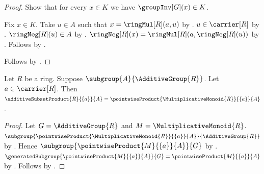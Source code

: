 \begin{proof}
    Show that for every $x\in K$ we have $\groupInv[G](x)\in K$.
    \begin{subproof}
        Fix $x\in K$.
        Take $u\in A$ such that $x=\ringMul[R](a,u)$ by
            .
        $u\in\carrier[R]$ by .
        $\ringNeg[R](u)\in A$ by
            .
        $\ringNeg[R](x)=\ringMul[R](a,\ringNeg[R](u))$ by
            .
        Follows by
            .
    \end{subproof}
    Follows by .
\end{proof}

\begin{proposition}\label{additive_subset_product_singleton_subgroup}
    Let $R$ be a ring.
    Suppose $\subgroup{A}{\AdditiveGroup{R}}$.
    Let $a\in\carrier[R]$.
    Then $\additiveSubsetProduct{R}{\{a\}}{A}
        =\pointwiseProduct{\MultiplicativeMonoid{R}}{\{a\}}{A}$.
\end{proposition}
\begin{proof}
    Let $G=\AdditiveGroup{R}$ and $M=\MultiplicativeMonoid{R}$.
    $\subgroup{
        \pointwiseProduct{\MultiplicativeMonoid{R}}{\{a\}}{A}}{
        \AdditiveGroup{R}}$ by
        .
    Hence $\subgroup{\pointwiseProduct{M}{\{a\}}{A}}{G}$ by
        \auto.
    $\generatedSubgroup{\pointwiseProduct{M}{\{a\}}{A}}{G}
        =\pointwiseProduct{M}{\{a\}}{A}$ by
        .
    Follows by .
\end{proof}

